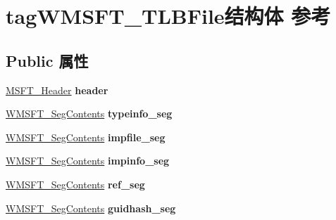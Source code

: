 \hypertarget{structtag_w_m_s_f_t___t_l_b_file}{}\section{tag\+W\+M\+S\+F\+T\+\_\+\+T\+L\+B\+File结构体 参考}
\label{structtag_w_m_s_f_t___t_l_b_file}
\subsection*{Public 属性}
\begin{DoxyCompactItemize}
\item 
\mbox{\label{structtag_w_m_s_f_t___t_l_b_file_a83cfbb87275dde4af09d0103cb9ab159}} 
\hyperlink{structtag_m_s_f_t___header}{M\+S\+F\+T\+\_\+\+Header} {\bfseries header}
\item 
\mbox{\label{structtag_w_m_s_f_t___t_l_b_file_a16160420d1c8ec54e3aabff9b208dd63}} 
\hyperlink{structtag_w_m_s_f_t___seg_contents}{W\+M\+S\+F\+T\+\_\+\+Seg\+Contents} {\bfseries typeinfo\+\_\+seg}
\item 
\mbox{\label{structtag_w_m_s_f_t___t_l_b_file_a9994d067c83335fc68812da0fa736978}} 
\hyperlink{structtag_w_m_s_f_t___seg_contents}{W\+M\+S\+F\+T\+\_\+\+Seg\+Contents} {\bfseries impfile\+\_\+seg}
\item 
\mbox{\label{structtag_w_m_s_f_t___t_l_b_file_a93e20b49098985be8abe592d458ec03d}} 
\hyperlink{structtag_w_m_s_f_t___seg_contents}{W\+M\+S\+F\+T\+\_\+\+Seg\+Contents} {\bfseries impinfo\+\_\+seg}
\item 
\mbox{\label{structtag_w_m_s_f_t___t_l_b_file_a554672ded0af4dcc6d3ccd3b194215c0}} 
\hyperlink{structtag_w_m_s_f_t___seg_contents}{W\+M\+S\+F\+T\+\_\+\+Seg\+Contents} {\bfseries ref\+\_\+seg}
\item 
\mbox{\label{structtag_w_m_s_f_t___t_l_b_file_aa71d780d707fce7d340e8ba512d9c9ae}} 
\hyperlink{structtag_w_m_s_f_t___seg_contents}{W\+M\+S\+F\+T\+\_\+\+Seg\+Contents} {\bfseries guidhash\+\_\+seg}
\item 

\end{DoxyCompactItemize}
